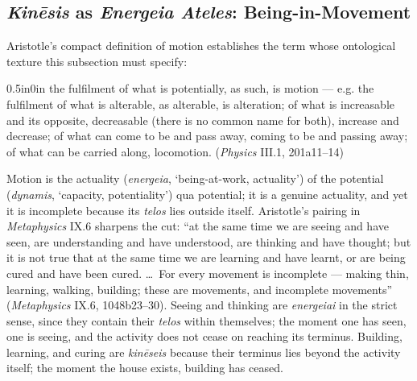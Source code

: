 \subsection{\textit{Kinēsis} as \textit{Energeia Ateles}: Being-in-Movement}

Aristotle's compact definition of motion establishes the term whose ontological texture this subsection must specify:
\begin{adjustwidth}{0.5in}{0in}
the fulfilment of what is potentially, as such, is motion --- e.g. the fulfilment of what is alterable, as alterable, is alteration; of what is increasable and its opposite, decreasable (there is no common name for both), increase and decrease; of what can come to be and pass away, coming to be and passing away; of what can be carried along, locomotion. (\textit{Physics} III.1, 201a11--14)
\end{adjustwidth}
Motion is the actuality (\textit{energeia},  `being-at-work, actuality') of the potential (\textit{dynamis},  `capacity, potentiality') qua potential; it is a genuine actuality, and yet it is incomplete because its \textit{telos} lies outside itself. Aristotle's pairing in \textit{Metaphysics} IX.6 sharpens the cut: ``at the same time we are seeing and have seen, are understanding and have understood, are thinking and have thought; but it is not true that at the same time we are learning and have learnt, or are being cured and have been cured. \ldots\ For every movement is incomplete --- making thin, learning, walking, building; these are movements, and incomplete movements'' (\textit{Metaphysics} IX.6, 1048b23--30). Seeing and thinking are \textit{energeiai} in the strict sense, since they contain their \textit{telos} within themselves; the moment one has seen, one is seeing, and the activity does not cease on reaching its terminus. Building, learning, and curing are \textit{kinēseis} because their terminus lies beyond the activity itself; the moment the house exists, building has ceased.

